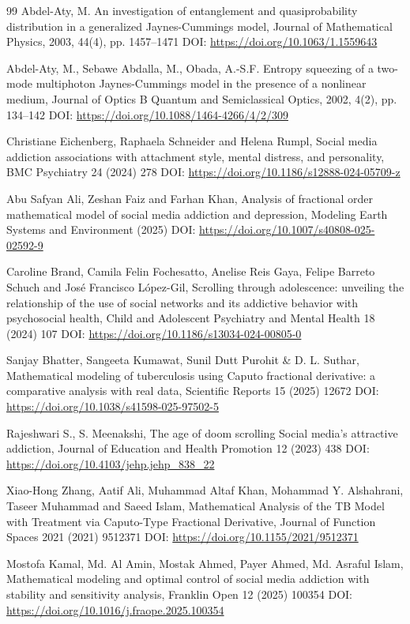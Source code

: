 \documentclass[10pt]{NSP1}
\begin{document}
\begin{thebibliography}{99}
 Abdel-Aty, M.
An investigation of entanglement and quasiprobability distribution in a generalized Jaynes-Cummings model, Journal of Mathematical Physics, 2003, 44(4), pp. 1457--1471 DOI: \url{https://doi.org/10.1063/1.1559643}

 Abdel-Aty, M., Sebawe Abdalla, M., Obada, A.-S.F.
Entropy squeezing of a two-mode multiphoton Jaynes-Cummings model in the presence of a nonlinear medium, Journal of Optics B Quantum and Semiclassical Optics, 2002, 4(2), pp. 134--142 DOI: \url{https://doi.org/10.1088/1464-4266/4/2/309}

Christiane Eichenberg, Raphaela Schneider and Helena Rumpl, Social media addiction associations with attachment style, mental distress, and personality, BMC Psychiatry 24 (2024) 278 DOI: \url{https://doi.org/10.1186/s12888-024-05709-z}

Abu Safyan Ali, Zeshan Faiz and Farhan Khan, Analysis of fractional order mathematical model of social media addiction and depression, Modeling Earth Systems and Environment (2025) DOI: \url{https://doi.org/10.1007/s40808-025-02592-9}

Caroline Brand, Camila Felin Fochesatto, Anelise Reis Gaya, Felipe Barreto Schuch and José Francisco López-Gil, Scrolling through adolescence: unveiling the relationship of the use of social networks and its addictive behavior with psychosocial health, Child and Adolescent Psychiatry and Mental Health 18 (2024) 107 DOI: \url{https://doi.org/10.1186/s13034-024-00805-0}

Sanjay Bhatter, Sangeeta Kumawat, Sunil Dutt Purohit \& D. L. Suthar, Mathematical modeling of tuberculosis using Caputo fractional derivative: a comparative analysis with real data, Scientific Reports 15 (2025) 12672 DOI: \url{https://doi.org/10.1038/s41598-025-97502-5}

Rajeshwari S., S. Meenakshi, The age of doom scrolling Social media's attractive addiction, Journal of Education and Health Promotion 12 (2023) 438 DOI: \url{https://doi.org/10.4103/jehp.jehp_838_22}

Xiao-Hong Zhang, Aatif Ali, Muhammad Altaf Khan, Mohammad Y. Alshahrani, Taseer Muhammad and Saeed Islam, Mathematical Analysis of the TB Model with Treatment via Caputo-Type Fractional Derivative, Journal of Function Spaces 2021 (2021) 9512371 DOI: \url{https://doi.org/10.1155/2021/9512371}

Mostofa Kamal, Md. Al Amin, Mostak Ahmed, Payer Ahmed, Md. Asraful Islam, Mathematical modeling and optimal control of social media addiction with stability and sensitivity analysis, Franklin Open 12 (2025) 100354 DOI: \url{https://doi.org/10.1016/j.fraope.2025.100354}


\end{thebibliography}
\end{document}
